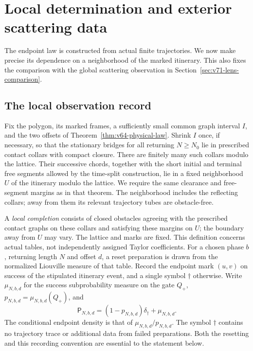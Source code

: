\section{Local determination and exterior scattering data}
\label{sec:v71-local-observation}

The endpoint law is constructed from actual finite trajectories.  We now
make precise its dependence on a neighborhood of the marked itinerary.
This also fixes the comparison with the global scattering observation
in Section~\ref{sec:v71-lens-comparison}.

\subsection{The local observation record}

Fix the polygon, its marked frames, a sufficiently small common graph
interval $I$, and the two offsets of
Theorem~\ref{thm:v64-physical-law}.  Shrink $I$ once, if necessary, so
that the stationary bridges for all returning $N\ge N_0$ lie in prescribed
contact collars with compact closure.  There are finitely many such
collars modulo the lattice.  Their successive chords, together with the
short initial and terminal free segments allowed by the time-split
construction, lie in a fixed neighborhood $U$ of the itinerary modulo
the lattice.  We require the same clearance and free-segment margins as
in that theorem.  The neighborhood includes the reflecting collars;
away from them its relevant trajectory tubes are obstacle-free.

A \emph{local completion} consists of closed obstacles agreeing with
the prescribed contact graphs on these collars and satisfying these
margins on $U$; the boundary away from $U$ may vary.  The lattice and marks
are fixed.  This definition concerns actual tables, not independently
assigned Taylor coefficients.  For a chosen phase $b$, returning length
$N$ and offset $d$, a reset preparation is drawn from the normalized
Liouville measure of that table.  Record the endpoint mark $(u,v)$ on
success of the stipulated itinerary event, and a single symbol $\dagger$
otherwise.  Write $\mu_{N,b,d}$ for the success subprobability measure on
the gate $Q_+$, $p_{N,b,d}=\mu_{N,b,d}(Q_+)$, and
\begin{equation}\label{eq:v71-record}
 \mathsf P_{N,b,d}
   =(1-p_{N,b,d})\delta_\dagger+\mu_{N,b,d}.
\end{equation}
The conditional endpoint density is that of $\mu_{N,b,d}/p_{N,b,d}$.
The symbol $\dagger$ contains no trajectory trace or additional data from
failed preparations.  Both the resetting and this recording convention
are essential to the statement below.

